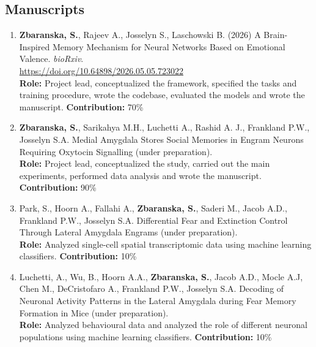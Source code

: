 \documentclass[12pt]{article}
\begin{document}
\subsection*{Manuscripts}
\begin{enumerate}
    \item \textbf{Zbaranska, S.}, Rajeev A., Josselyn S., Laschowski B. (2026) A Brain-Inspired Memory Mechanism for Neural Networks Based on Emotional Valence. \textit{bioRxiv}. \\
    \href{https://doi.org/10.64898/2026.05.05.723022}{https://doi.org/10.64898/2026.05.05.723022} \\
    \textbf{Role:} Project lead, conceptualized the framework, specified the tasks and training procedure, wrote the codebase, evaluated the models and wrote the manuscript.
    \textbf{Contribution:} 70\%

    \item \textbf{Zbaranska, S.}, Sarikahya M.H., Luchetti A., Rashid A. J., Frankland P.W., Josselyn S.A. Medial Amygdala Stores Social Memories in Engram Neurons Requiring Oxytocin Signalling (under preparation). \\
    \textbf{Role:} Project lead, conceptualized the study, carried out the main experiments, performed data analysis and wrote the manuscript.
    \textbf{Contribution:} 90\%

    \item  Park, S., Hoorn A., Fallahi A., \textbf{Zbaranska, S.}, Saderi M., Jacob A.D., Frankland P.W., Josselyn S.A. Differential Fear and Extinction Control Through Lateral Amygdala Engrams (under preparation). \\
    \textbf{Role:} Analyzed single-cell spatial transcriptomic data using machine learning classifiers.
    \textbf{Contribution:} 10\%

    \item Luchetti, A., Wu, B., Hoorn A.A., \textbf{Zbaranska, S.}, Jacob A.D., Mocle A.J,  Chen M., DeCristofaro A., Frankland P.W., Josselyn S.A. Decoding of Neuronal Activity Patterns in the Lateral Amygdala during Fear Memory Formation in Mice (under preparation). \\
    \textbf{Role:} Analyzed behavioural data and analyzed the role of different neuronal populations using machine learning classifiers. 
    \textbf{Contribution:} 10\%

\end{enumerate}

\end{document}
